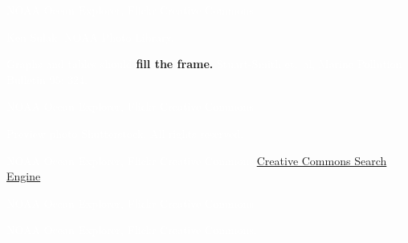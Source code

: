 \documentclass[t]{beamer}
\begin{document}
{
\begin{frame}[b]
\tiny\textcolor{white}{NOAA Ocean Explorer, Flickr Creative Commons.}
\end{frame}
}

{
\begin{frame}[b]
\tiny\hfill\textcolor{white}{Ken Sulak, NOAA Photo Library.}
\end{frame}
}

{
\begin{frame}[b]
\end{frame}
}

{
	\begin{frame}[b]{\textcolor{white}{Graphs and tables should} \textcolor{orange4}{\textbf{fill the frame.}}}
	\hfill \tiny \textcolor{white}{Stuart-Smith et.~al, Marine Pollution Bulletin 95: 324.}
\end{frame}
}


{
\begin{frame}[b]
\tiny\textcolor{white}{NOAA Ocean Explorer, Flickr Creative Commons.}
\end{frame}
}

{
\begin{frame}[b]
\tiny\hfill\textcolor{white}{Preview photo \textcopyright Shutterstock. All rights reserved.}
\end{frame}
}


{
\begin{frame}[b]
\tiny\textcolor{white}{NOAA Ocean Explorer, Flickr Creative Commons.\hfill\href{http://search.creativecommons.org}{Creative Commons Search Engine}}
\end{frame}
}

{
\begin{frame}[b]
\tiny\hfill\textcolor{white}{NOAA Ocean Explorer, Flickr Creative Commons.}
\end{frame}
}

{
\begin{frame}[b]
\tiny\textcolor{white}{NOAA Ocean Explorer, Flickr Creative Commons.}
\end{frame}
}
\end{document}
